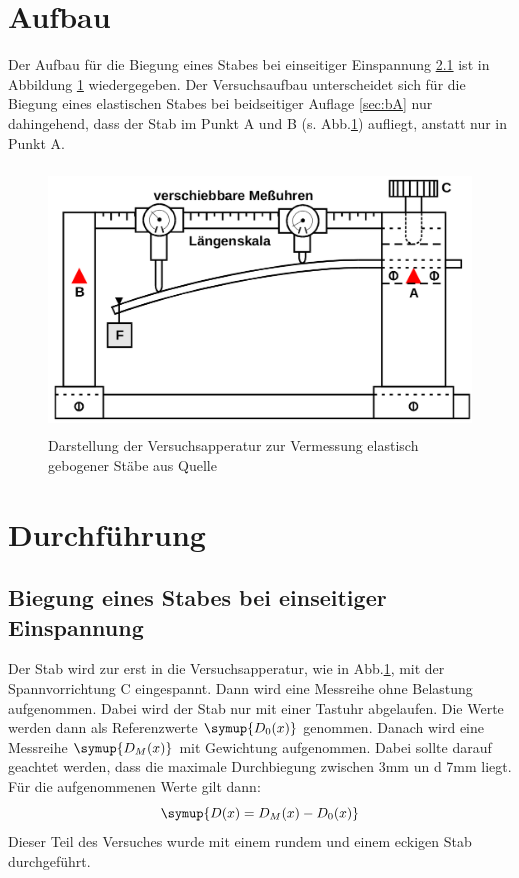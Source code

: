 \section{Aufbau}
\label{sec:Aufbau}
Der Aufbau für die Biegung eines Stabes bei einseitiger Einspannung \ref{sec:eE}
ist in
Abbildung \ref{fig:abb6} wiedergegeben. Der Versuchsaufbau unterscheidet sich
für die Biegung eines elastischen Stabes bei beidseitiger Auflage
\ref{sec:bA} nur
dahingehend, dass der Stab im Punkt A und B (s. Abb.\ref{fig:abb6}) aufliegt,
anstatt nur in Punkt A.
\begin{figure}
  \centering
  \includegraphics[height = 7cm]{logos/Abb6.png}
  \caption{Darstellung der Versuchsapperatur zur Vermessung elastisch gebogener
  Stäbe aus Quelle \cite{Anleitung}}
  \label{fig:abb6}
\end{figure}
\FloatBarrier
\section{Durchführung}
\label{sec:Durchführung}
\subsection{Biegung eines Stabes bei einseitiger Einspannung}
\label{sec:eE}
Der Stab wird zur erst in die Versuchsapperatur, wie in Abb.\ref{fig:abb6},
mit der Spannvorrichtung C eingespannt. Dann wird eine Messreihe ohne Belastung
aufgenommen. Dabei wird der Stab nur mit einer Tastuhr abgelaufen. Die Werte
werden dann als Referenzwerte $\symup{D_0 (x)}$ genommen. Danach wird eine
Messreihe $\symup{D_M (x)}$
mit Gewichtung aufgenommen. Dabei sollte darauf geachtet werden, dass
die maximale Durchbiegung zwischen 3mm un d 7mm liegt. Für die aufgenommenen
Werte gilt dann:
\begin{equation}
  \symup{D(x) = D_M (x) - D_0 (x)}
  \label{eqn:DM0}
\end{equation}
Dieser Teil des Versuches wurde mit einem rundem und einem eckigen Stab
durchgeführt.
